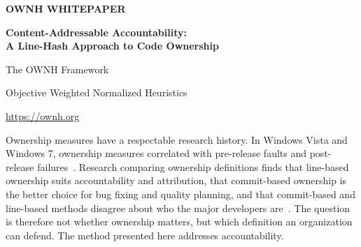 \documentclass[11pt,a4paper]{article}
\makeatletter
\renewcommand\section{\@startsection{section}{1}{\z@}{-2.2ex plus -0.5ex}{1ex}{\sffamily\large\bfseries\color{brand}}}
\newcommand{\ownh}{OWNH}
\makeatother
\begin{document}
\thispagestyle{empty}
\begin{center}
  {\sffamily\small\color{brand}\textbf{OWNH WHITEPAPER}}\par\vspace{1.2em}
  {\LARGE\bfseries Content-Addressable Accountability:\\[0.2em] A Line-Hash Approach to Code Ownership\par}
  \vspace{1em}
  {\large The \ownh{} Framework\par}
  \vspace{0.3em}
  {\small\sffamily Objective Weighted Normalized Heuristics\par}
  \vspace{0.3em}
  {\small\url{https://ownh.org}\par}
\end{center}
\vspace{1em}

\begin{abstract}
\noindent Engineering organizations need to know who owns their code. Existing
answers depend on activity (commit counts), recency (\texttt{git blame}), or
declarations (\texttt{CODEOWNERS} files), and each can be changed by the
behavior it is meant to measure. This paper presents \ownh{}, a method that
assigns every line of code to exactly one owner using only the line's content
hash and the version history of the repositories that contain it. The owner of
a line is the first contributor, across all repositories under analysis, to
commit a line with that exact content. The assignment is deterministic,
independent of the order in which repositories are analyzed, and permanent for
a fixed scope of analyzed histories.
The definitions, the attribution procedure, the benchmark against
established methods, and the derived governance metrics: ownership leverage,
code demolition, code survival, and quarterly projections suitable for
objectives and key results, are described.
\end{abstract}

\section{Introduction}

Ownership measures have a respectable research history. In Windows Vista and
Windows 7, ownership measures correlated with pre-release faults and
post-release failures~\cite{bird}. Research comparing ownership definitions
finds that line-based ownership suits accountability and attribution, that
commit-based ownership is the better choice for bug fixing and quality
planning, and that commit-based and line-based methods disagree about who the
major developers are~\cite{lines}. The question is therefore not whether
ownership matters, but which definition an organization can defend. The method
presented here addresses accountability.
\end{document}
